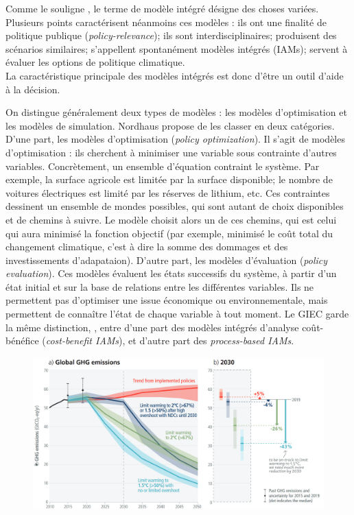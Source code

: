 Comme le souligne \cite{cointe_organising_2019}, le terme de modèle intégré désigne des choses variées. Plusieurs points caractérisent néanmoins ces modèles : ils ont une finalité de politique publique (\emph{policy-relevance}); ils sont interdisciplinaires; produisent des scénarios similaires; s'appellent spontanément modèles intégrés (IAMs); servent à évaluer les options de politique climatique. \\

La caractéristique principale des modèles intégrés est donc d'être un outil d'aide à la décision. 

On distingue généralement deux types de modèles : les modèles d'optimisation et les modèles de simulation.  
Nordhaus \cite{nordhaus_dice_2013} propose de les classer en deux catégories. D'une part, les modèles d'optimisation (\emph{policy optimization}). Il s'agit de modèles d'optimisation : ils cherchent à minimiser une variable sous contrainte d'autres variables. Concrètement, un ensemble d'équation contraint le système. Par exemple, la surface agricole est limitée par la surface disponible; le nombre de voitures électriques est limité par les réserves de lithium, etc. Ces contraintes dessinent un ensemble de mondes possibles, qui sont autant de choix disponibles et de chemins à suivre. Le modèle choisit alors un de ces chemins, qui est celui qui aura minimisé la fonction objectif (par exemple, minimisé le coût total du changement climatique, c'est à dire la somme des dommages et des investissements d'adapataion). D'autre part, les modèles d'évaluation (\emph{policy evaluation}). Ces modèles évaluent les états successifs du système, à partir d'un état initial et sur la base de relations entre les différentes variables. Ils ne permettent pas d'optimiser une issue économique ou environnementale, mais permettent de connaître l'état de chaque variable à tout moment. 
Le GIEC garde la même distinction,  \cite{intergovernmental_panel_on_climate_change_ipcc_annex_2023}, entre d'une part des modèles intégrés d'analyse coût-bénéfice (\emph{cost-benefit IAMs}), et d'autre part des \emph{process-based IAMs}.



\begin{figure}
    \centering
    \includegraphics[width=0.9\linewidth]{figures/spm2_5.png}
    \label{fig:ipcc-pathways}
\end{figure}

